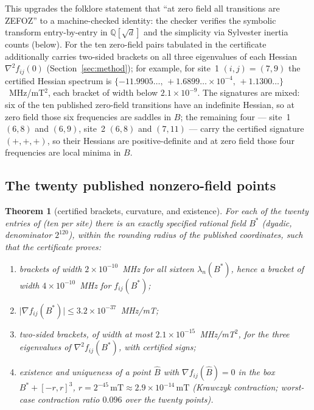 \documentclass[11pt]{amsart}
\newcommand{\mT}{\mathrm{mT}}
\theoremstyle{plain}
\newtheorem{theorem}{Theorem}[section]
\theoremstyle{definition}
\theoremstyle{remark}
\begin{document}
This upgrades the folklore statement that ``at zero field all transitions are
ZEFOZ'' to a machine-checked identity: the checker verifies the symbolic
transform entry-by-entry in $\mathbb Q[\sqrt d]$ and the simplicity via
Sylvester inertia counts (below).  For the ten zero-field pairs tabulated in
\cite[Table~4]{Matsuura} the certificate additionally carries two-sided
brackets on all three eigenvalues of each Hessian $\nabla^2 f_{ij}(0)$
(Section~\ref{sec:method}); for example, for site~1 $(i,j)=(7,9)$ the certified
Hessian spectrum is $\{-11.9905\ldots,\,+1.6899\ldots\times10^{-4},\,
+1.1300\ldots\}$~MHz/mT$^2$, each bracket of width below $2.1\times10^{-9}$.  The
signatures are mixed: six of the ten published zero-field transitions have an
indefinite Hessian, so at zero field those six frequencies are saddles in $B$;
the remaining four --- site~1 $(6,8)$ and $(6,9)$, site~2 $(6,8)$ and $(7,11)$
--- carry the certified signature $(+,+,+)$, so their Hessians are
positive-definite and at zero field those four frequencies are local minima
in $B$.

\subsection{The twenty published nonzero-field points}\label{sec:points}

\begin{theorem}[certified brackets, curvature, and existence]\label{thm:points}
For each of the twenty entries of \cite[Table~5]{Matsuura} (ten per site)
there is an exactly specified rational field $B^*$ (dyadic, denominator
$2^{120}$), within the rounding radius of the published coordinates, such that
the certificate proves:
\begin{enumerate}
\item[(i)] brackets of width $2\times10^{-10}$~MHz for all sixteen
$\lambda_n(B^*)$, hence a bracket of width $4\times10^{-10}$~MHz for
$f_{ij}(B^*)$;
\item[(ii)] $\lvert\nabla f_{ij}(B^*)\rvert \le 3.2\times10^{-37}$~MHz/mT;
\item[(iii)] two-sided brackets, of width at most $2.1\times10^{-15}$~MHz/mT$^2$,
for the three eigenvalues of $\nabla^2 f_{ij}(B^*)$, with certified signs;
\item[(iv)] existence and uniqueness of a point $\hat B$ with $\nabla
f_{ij}(\hat B)=0$ in the box $B^*+[-r,r]^3$, $r=2^{-45}\,\mT\approx
2.9\times10^{-14}\,\mT$ (Krawczyk contraction; worst-case contraction ratio
$0.096$ over the twenty points).
\end{enumerate}
\end{theorem}
\end{document}
